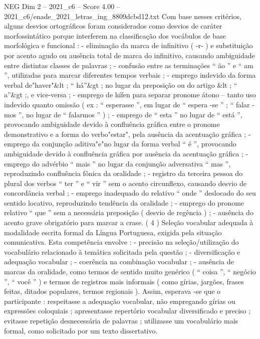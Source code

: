 \begin{textsample}{NEG Dim 2 – 2021\_c6 – Score 4.00 – 2021\_c6/enade\_2021\_letras\_ing\_8809dcbd12.txt}
Com base nesses critérios, alguns desvios ortográficos foram considerados como desvios de caráter morfossintático porque interferem na classificação dos vocábulos de base morfológica e funcional : - eliminação da marca de infinitivo ( -r- ) e substituição por acento agudo ou ausência total de marca do infinitivo, causando ambiguidade entre distintas classes de palavras ; - confusão entre as terminações “ ão ” e “ am ”, utilizadas para marcar diferentes tempos verbais ; - emprego indevido da forma verbal de"haver"\&lt ; “ há”\&gt ; no lugar da preposição ou do artigo \&lt ; “ a”\&gt ;, e vice-versa ; - emprego de hífen para separar pronome átono – tanto uso indevido quanto omissão ( ex : “ esperasse ”, em lugar de “ espera -se ” ; “ falar -mos ”, no lugar de “ falarmos ” ) ; - emprego de “ esta ” no lugar de “ está ”, provocando ambiguidade devido à confluência gráfica entre o pronome demonstrativo e a forma do verbo"estar", pela ausência da acentuação gráfica ; - emprego da conjunção aditiva"e"no lugar da forma verbal “ é ”, provocando ambiguidade devido à confluência gráfica por ausência da acentuação gráfica ; - emprego do advérbio “ mais ” no lugar da conjunção adversativa “ mas ”, reproduzindo confluência fônica da oralidade ; - registro da terceira pessoa do plural dos verbos “ ter ” e “ vir ” sem o acento circunflexo, causando desvio de concordância verbal ; - emprego inadequado do relativo “ onde ” deslocado do seu sentido locativo, reproduzindo tendência da oralidade ; - emprego do pronome relativo “ que ” sem a necessária preposição ( desvio de regência ) ; - ausência do acento grave obrigatório para marcar a crase. ( 4 ) Seleção vocabular adequada à modalidade escrita formal da Língua Portuguesa, exigida pela situação comunicativa.
Esta competência envolve : - precisão na seleção/utilização do vocabulário relacionado à temática solicitada pela questão ; - diversificação e adequação vocabular ; - coerência na combinação vocabular ; - ausência de marcas da oralidade, como termos de sentido muito genérico ( “ coisa ”, “ negócio ”, “ você ” ) e termos de registros mais informais ( como gírias, jargões, frases feitas, ditados populares, termos regionais ).
Assim, esperava -se que o participante : respeitasse a adequação vocabular, não empregando gírias ou expressões coloquiais ; apresentasse repertório vocabular diversificado e preciso ; evitasse repetição desnecessária de palavras ; utilizasse um vocabulário mais formal, como solicitado por um texto dissertativo.

\end{textsample}
